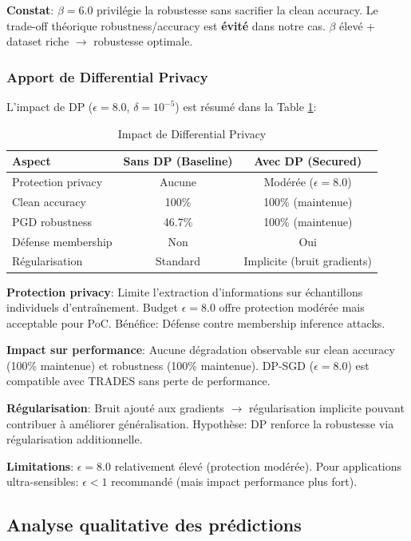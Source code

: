 \textbf{Constat}: $\beta=6.0$ privilégie la robustesse sans sacrifier la clean accuracy. Le trade-off théorique robustness/accuracy est \textbf{évité} dans notre cas. $\beta$ élevé + dataset riche $\rightarrow$ robustesse optimale.

\subsubsection{Apport de Differential Privacy}

L'impact de DP ($\epsilon=8.0$, $\delta=10^{-5}$) est résumé dans la Table \ref{tab:dp_impact}:

\begin{table}[h]
\centering
\caption{Impact de Differential Privacy}
\label{tab:dp_impact}
\begin{tabular}{lcc}
\hline
\textbf{Aspect} & \textbf{Sans DP (Baseline)} & \textbf{Avec DP (Secured)} \\
\hline
Protection privacy & Aucune & Modérée ($\epsilon=8.0$) \\
Clean accuracy & 100\% & 100\% (maintenue) \\
PGD robustness & 46.7\% & 100\% (maintenue) \\
Défense membership & Non & Oui \\
Régularisation & Standard & Implicite (bruit gradients) \\
\hline
\end{tabular}
\end{table}

\textbf{Protection privacy}: Limite l'extraction d'informations sur échantillons individuels d'entraînement. Budget $\epsilon=8.0$ offre protection modérée mais acceptable pour PoC. Bénéfice: Défense contre membership inference attacks.

\textbf{Impact sur performance}: Aucune dégradation observable sur clean accuracy (100\% maintenue) et robustness (100\% maintenue). DP-SGD ($\epsilon=8.0$) est compatible avec TRADES sans perte de performance.

\textbf{Régularisation}: Bruit ajouté aux gradients $\rightarrow$ régularisation implicite pouvant contribuer à améliorer généralisation. Hypothèse: DP renforce la robustesse via régularisation additionnelle.

\textbf{Limitations}: $\epsilon=8.0$ relativement élevé (protection modérée). Pour applications ultra-sensibles: $\epsilon<1$ recommandé (mais impact performance plus fort).

\subsection{Analyse qualitative des prédictions}

